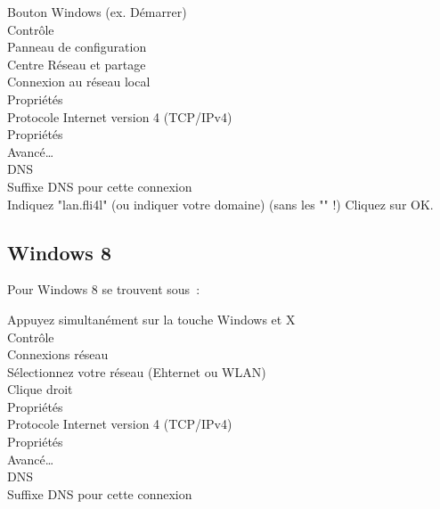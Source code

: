   \noindent Bouton Windows (ex. Démarrer) \pfeil\\
  \hspace*{2ex}Contrôle \pfeil\\
  \hspace*{4ex}Panneau de configuration \pfeil\\
  \hspace*{6ex}Centre Réseau et partage \pfeil\\
  \hspace*{8ex}Connexion au réseau local \pfeil\\
  \hspace*{10ex}Propriétés \pfeil\\
  \hspace*{12ex}Protocole Internet version 4 (TCP/IPv4) \pfeil\\
  \hspace*{14ex}Propriétés \pfeil\\
  \hspace*{16ex}Avancé\ldots \pfeil\\
  \hspace*{18ex}DNS \pfeil\\
  \hspace*{20ex}Suffixe DNS pour cette connexion \pfeil\\

  Indiquez "lan.fli4l" (ou indiquer votre domaine) (sans les "" !)
  \pfeil Cliquez sur OK.

\subsection{Windows 8}

  Pour Windows 8 se trouvent sous~:

  \noindent Appuyez simultanément sur la touche Windows et X \pfeil\\
  \hspace*{2ex}Contrôle \pfeil\\
  \hspace*{4ex}Connexions réseau \pfeil\\
  \hspace*{6ex}Sélectionnez votre réseau (Ehternet ou WLAN) \pfeil\\
  \hspace*{8ex}Clique droit \pfeil\\
  \hspace*{10ex}Propriétés \pfeil\\
  \hspace*{12ex}Protocole Internet version 4 (TCP/IPv4) \pfeil\\
  \hspace*{14ex}Propriétés \pfeil\\
  \hspace*{16ex}Avancé\ldots \pfeil\\
  \hspace*{18ex}DNS \pfeil\\
  \hspace*{20ex}Suffixe DNS pour cette connexion \pfeil\\

